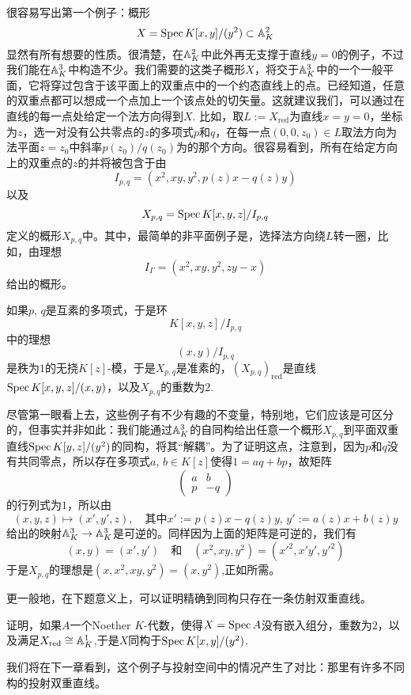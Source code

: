 很容易写出第一个例子：概形
\[
	X=\operatorname{Spec} K[x,y]/(y^2)\subset \mathbb{A}_K^2
\]
显然有所有想要的性质。很清楚，在$\mathbb{A}_K^2$中此外再无支撑于直线$y=0$的例子，不过我们能在$\mathbb{A}_K^3$中构造不少。我们需要的这类子概形$X$，将交于$\mathbb{A}_{K}^3$中的一个一般平面，它将穿过包含于该平面上的双重点中的一个约态直线上的点。\nottran 已经知道，任意的双重点都可以想成一个点加上一个该点处的切矢量。这就建议我们，可以通过在直线的每一点处给定一个法方向得到$X$. 比如，取$L:=X_{\text{red}}$为直线$x=y=0$，坐标为$z$，选一对没有公共零点的$z$的多项式$p$和$q$，在每一点$(0,0,z_0)\in L$取法方向为法平面$z=z_0$中斜率$p(z_0)/q(z_0)$为的那个方向。很容易看到，所有在给定方向上的双重点的$z$的并将被包含于由
\[
	I_{p,q}=(x^2,xy,y^2,p(z)x-q(z)y)
\]
以及
\[
	X_{p,q}=\operatorname{Spec} K[x,y,z]/I_{p,q}
\]
定义的概形$X_{p,q}$中。其中，最简单的非平面例子是，选择法方向绕$L$转一圈，比如，由理想
\[
	I_\Gamma=(x^2,xy,y^2,zy-x)
\]
给出的概形。


\begin{exe}
如果$p$, $q$是互素的多项式，于是环
\[
	K[x,y,z]/I_{p,q}
\]
中的理想
\[
	(x,y)/I_{p,q}
\]
是秩为$1$的无挠$K[z]$-模，于是$X_{p,q}$是准素的，$(X_{p,q})_{\text{red}}$是直线$\operatorname{Spec} K[x,y,z]/(x,y)$，以及$X_{p,q}$的重数为$2$.
\end{exe}

尽管第一眼看上去，这些例子有不少有趣的不变量，特别地，它们应该是可区分的，但事实并非如此：我们能通过$\mathbb{A}_{K}^3$的自同构给出任意一个概形$X_{p,q}$到平面双重直线$\operatorname{Spec} K[y,z]/(y^2)$的同构，将其“解耦”。为了证明这点，注意到，因为$p$和$q$没有共同零点，所以存在多项式$a$, $b\in K[z]$使得$1=aq+bp$，故矩阵
\[
	\begin{pmatrix}
	a&b\\
	p&-q
	\end{pmatrix}
\]
的行列式为$1$，所以由
\[
	(x,y,z)\mapsto (x',y',z),\quad \text{其中$x':=p(z)x-q(z)y$, $y':=a(z)x+b(z)y$}
\]
给出的映射$\mathbb{A}_K^3\to \mathbb{A}_K^3$是可逆的。同样因为上面的矩阵是可逆的，我们有
\[
	(x,y)=(x',y')\quad\text{和}\quad (x^2,xy,y^2)=({x'}^2,x'y',{y'}^2)
\]
于是$X_{p,q}$的理想是$(x,x^2,xy,y^2)=(x,y^2)$,正如所需。

更一般地，在下题意义上，可以证明精确到同构只存在一条仿射双重直线。

\begin{exe}
	证明，如果$A$一个Noether $K$-代数，使得$X=\operatorname{Spec} A$没有嵌入组分，重数为$2$，以及满足$X_{\text{red}}\cong \mathbb{A}_K^1$,于是$X$同构于$\operatorname{Spec} K[x,y]/(y^2)$.
\end{exe}

我们将在下一章看到，这个例子与投射空间中的情况产生了对比：那里有许多不同构的投射双重直线。